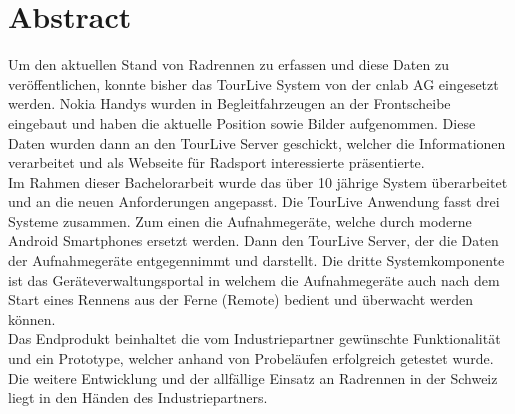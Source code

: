 \chapter*{Abstract}
Um den aktuellen Stand von Radrennen zu erfassen und diese Daten zu veröffentlichen, konnte bisher das TourLive System von der cnlab AG eingesetzt werden. Nokia Handys wurden in Begleitfahrzeugen an der Frontscheibe eingebaut und haben die aktuelle Position sowie Bilder aufgenommen. Diese Daten wurden dann an den TourLive Server geschickt, welcher die Informationen verarbeitet und als Webseite für Radsport interessierte präsentierte.
\\
Im Rahmen dieser Bachelorarbeit wurde das über 10 jährige System überarbeitet und an die neuen Anforderungen angepasst. Die TourLive Anwendung fasst drei Systeme zusammen. Zum einen die Aufnahmegeräte, welche durch moderne Android Smartphones ersetzt werden. Dann den TourLive Server, der die Daten der Aufnahmegeräte entgegennimmt und darstellt. Die dritte Systemkomponente ist das Geräteverwaltungsportal in welchem die Aufnahmegeräte auch nach dem Start eines Rennens aus der Ferne (Remote) bedient und überwacht werden können.
\\
Das Endprodukt beinhaltet die vom Industriepartner gewünschte Funktionalität und ein Prototype, welcher anhand von Probeläufen erfolgreich getestet wurde. Die weitere Entwicklung und der allfällige Einsatz an Radrennen in der Schweiz liegt in den Händen des Industriepartners.